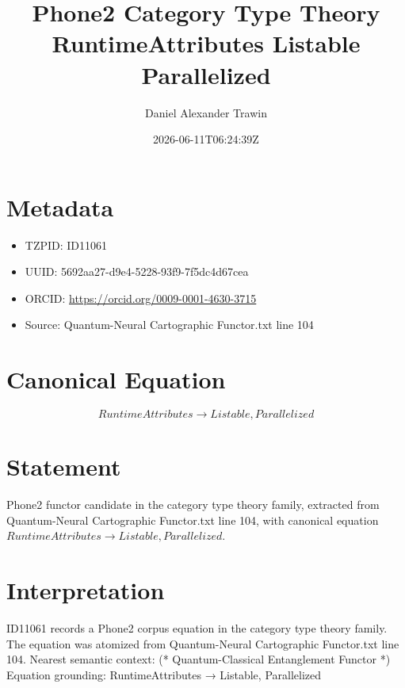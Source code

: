 \documentclass[11pt]{article}
\title{Phone2 Category Type Theory RuntimeAttributes Listable Parallelized}
\author{Daniel Alexander Trawin}
\date{2026-06-11T06:24:39Z}
\begin{document}
\maketitle
\section*{Metadata}
\begin{itemize}
\item TZPID: ID11061
\item UUID: 5692aa27-d9e4-5228-93f9-7f5dc4d67cea
\item ORCID: \url{https://orcid.org/0009-0001-4630-3715}
\item Source: Quantum-Neural Cartographic Functor.txt line 104
\end{itemize}
\section*{Canonical Equation}
\[
RuntimeAttributes → {Listable, Parallelized}
\]
\section*{Statement}
Phone2 functor candidate in the category type theory family, extracted from Quantum-Neural Cartographic Functor.txt line 104, with canonical equation $RuntimeAttributes → {Listable, Parallelized}$.
\section*{Interpretation}
ID11061 records a Phone2 corpus equation in the category type theory family. The equation was atomized from Quantum-Neural Cartographic Functor.txt line 104. Nearest semantic context: (* Quantum-Classical Entanglement Functor *) Equation grounding: RuntimeAttributes → {Listable, Parallelized}
\end{document}
